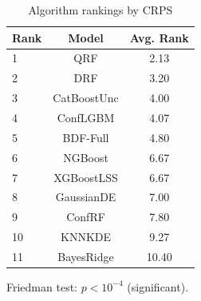 \begin{table}[htbp]
\centering
\caption{Algorithm rankings by CRPS}
\label{tab:rankings-crps}
\begin{tabular}{lcc}
\toprule
Rank & Model & Avg. Rank \\
\midrule
1 & QRF & 2.13 \\
2 & DRF & 3.20 \\
3 & CatBoostUnc & 4.00 \\
4 & ConfLGBM & 4.07 \\
5 & BDF-Full & 4.80 \\
6 & NGBoost & 6.67 \\
7 & XGBoostLSS & 6.67 \\
8 & GaussianDE & 7.00 \\
9 & ConfRF & 7.80 \\
10 & KNNKDE & 9.27 \\
11 & BayesRidge & 10.40 \\
\bottomrule
\end{tabular}
\par\smallskip\footnotesize{Friedman test: $p < 10^{-4}$ (significant).}
\end{table}

